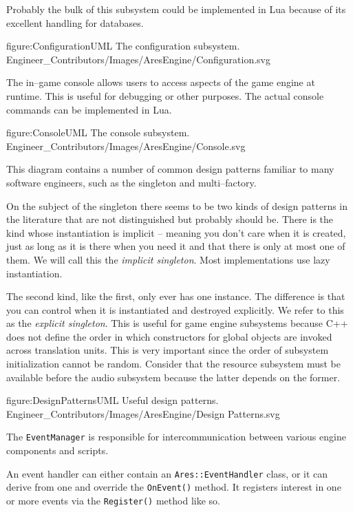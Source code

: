 Probably the bulk of this subsystem could be implemented in Lua because of its excellent handling for databases.

\FullPageDiagram
    {figure:ConfigurationUML}
    {The configuration subsystem.}
    {Engineer_Contributors/Images/AresEngine/Configuration.svg}

\page
{}
The in--game console allows users to access aspects of the game engine at runtime. This is useful for debugging or other purposes. The actual console commands can be implemented in Lua.

\FullPageDiagram
    {figure:ConsoleUML}
    {The console subsystem.}
    {Engineer_Contributors/Images/AresEngine/Console.svg}

\page
{}
This diagram contains a number of common design patterns familiar to many software engineers, such as the singleton and multi--factory.

On the subject of the singleton there seems to be two kinds of design patterns in the literature that are not distinguished but probably should be. There is the kind whose instantiation is implicit -- meaning you don't care when it is created, just as long as it is there when you need it and that there is only at most one of them. We will call this the {\it implicit singleton}. Most implementations use lazy instantiation.

The second kind, like the first, only ever has one instance. The difference is that you can control when it is instantiated and destroyed explicitly. We refer to this as the {\it explicit singleton}. This is useful for game engine subsystems because C++ does not define the order in which constructors for global objects are invoked across translation units. This is very important since the order of subsystem initialization cannot be random. Consider that the resource subsystem must be available before the audio subsystem because the latter depends on the former.

\FullPageDiagram
    {figure:DesignPatternsUML}
    {Useful design patterns.}
    {Engineer_Contributors/Images/AresEngine/Design Patterns.svg}

\page 
{}
The {\tt EventManager} is responsible for intercommunication between various engine components and scripts.

An event handler can either contain an {\tt Ares::EventHandler} class, or it can derive from one and override the {\tt OnEvent()} method. It registers interest in one or more events via the {\tt Register()} method like so.

